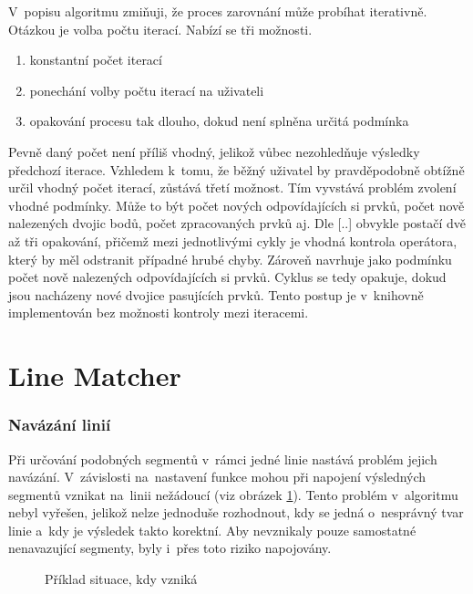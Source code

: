 V~popisu algoritmu zmiňuji, že proces zarovnání může probíhat iterativně.
Otázkou je volba počtu iterací. Nabízí se tři možnosti.
\begin{enumerate}
 \item konstantní počet iterací
 \item ponechání volby počtu iterací na uživateli
 \item opakování procesu tak dlouho, dokud není splněna určitá podmínka
\end{enumerate}
Pevně daný počet není příliš vhodný, jelikož vůbec nezohledňuje výsledky
předchozí iterace. Vzhledem k~tomu, že běžný uživatel by pravděpodobně
obtížně určil vhodný počet iterací, zůstává třetí možnost. Tím vyvstává
problém zvolení vhodné podmínky. Může to být počet nových odpovídajících 
si prvků, počet nově nalezených dvojic bodů, počet zpracovaných prvků aj.
Dle [..]  obvykle postačí dvě až tři opakování, %
přičemž mezi jednotlivými cykly je vhodná kontrola operátora,
který by měl odstranit případné hrubé chyby. Zároveň navrhuje jako podmínku
počet nově nalezených odpovídajících si prvků. Cyklus se tedy opakuje,
dokud jsou nacházeny nové dvojice pasujících prvků. Tento postup je   %
v~knihovně  implementován bez možnosti kontroly mezi iteracemi. 


\section{Line Matcher}
\label{problemy-lm}

\subsubsection*{Navázání linií}
Při určování podobných segmentů v~rámci jedné linie nastává problém jejich
navázání. V~závislosti na~nastavení funkce mohou při napojení výsledných
segmentů vznikat na~linii nežádoucí  (viz obrázek \ref{fig:toothpic}). %
Tento problém v~algoritmu nebyl vyřešen, jelikož nelze jednoduše rozhodnout, 
kdy se jedná o~nesprávný tvar linie a~kdy je výsledek takto korektní.
Aby nevznikaly pouze samostatné nenavazující segmenty, byly i~přes toto
riziko napojovány.

\label{toothpic}
  \begin{figure}[hbt]
    \centering
      
      \caption{Příklad situace, kdy vzniká }
      \label{fig:toothpic}
  \end{figure}

